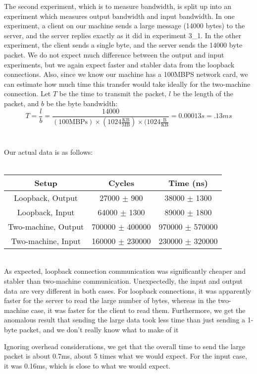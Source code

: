 \noindent The second experiment, which is to measure bandwidth, is split up into an experiment which measures output bandwidth and input bandwidth. In one experiment, a client on our machine sends a large message (14000 bytes) to the server, and the server replies exactly as it did in experiment 3\_1. In the other experiment, the client sends a single byte, and the server sends the 14000 byte packet. We do not expect much difference between the output and input experiments, but we again expect faster and stabler data from the loopback connections. Also, since we know our machine has a 100MBPS network card, we can estimate how much time this transfer would take ideally for the two-machine connection. Let $T$ be the time to transmit the packet, $l$ be the length of the packet, and $b$ be the byte bandwidth:
\[
T = \frac{l}{b} = \frac{14000}{(100\mathrm{MBPs}) \times (1024 \frac{\mathrm{KB}}{\mathrm{MB}}) \times (1024 \frac{\mathrm{B}}{\mathrm{KB}}} = 0.00013 s = .13ms
\]
\\
\\
Our actual data is as follows:
\\
\\
\begin{tabular}{|c|c|c|}
\hline
\textbf{Setup} & \textbf{Cycles} & \textbf{Time (ns)}\\\hline
Loopback, Output & 27000 $\pm$ 900 & 38000 $\pm$ 1300 \\\hline
Loopback, Input & 64000 $\pm$ 1300 & 89000 $\pm$ 1800 \\\hline
Two-machine, Output & 700000 $\pm$ 400000 & 970000 $\pm$ 570000 \\\hline
Two-machine, Input & 160000 $\pm$ 230000 & 230000 $\pm$ 320000 \\\hline
\end{tabular}
~\\

\noindent As expected, loopback connection communication was significantly cheaper and stabler than two-machine communication. Unexpectedly, the input and output data are very different in both cases. For loopback connections, it was apparently faster for the server to read the large number of bytes, whereas in the two-machine case, it was faster for the client to read them. Furthermore, we get the anomalous result that sending the large data took less time than just sending a 1-byte packet, and we don't really know what to make of it

Ignoring overhead considerations, we get that the overall time to send the large packet is about 0.7ms, about 5 times what we would expect. For the input case, it was 0.16ms, which is close to what we would expect.